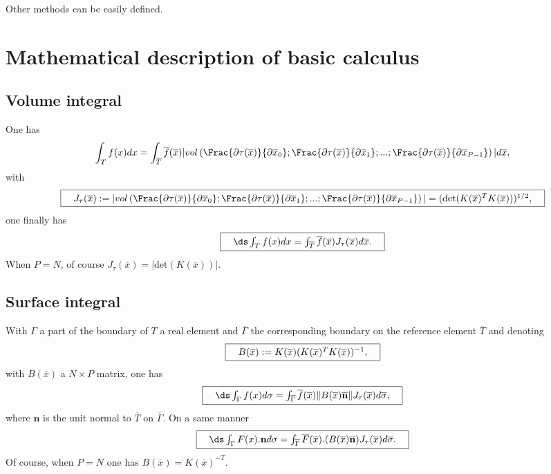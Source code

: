 \documentclass[11pt,a4paper]{article}
\begin{document}
Other methods can be easily defined.

\section{Mathematical description of basic calculus}

\subsection{Volume integral}
One has
$$ \int_T f(x) dx = \int_{\overline{T}} \overline{f}(\overline{x}) |vol\left(\Frac{\partial \tau(\overline{x})}{\partial \overline{x}_0} ;\Frac{\partial \tau(\overline{x})}{\partial \overline{x}_1}; ...; \Frac{\partial \tau(\overline{x})}{\partial \overline{x}_{P-1} }\right)| d\overline{x}, $$
with
$$ \fbox{$\hspace{1em} J_{\tau}(\overline{x}) := |vol\left(\Frac{\partial \tau(\overline{x})}{\partial \overline{x}_0} ;\Frac{\partial \tau(\overline{x})}{\partial \overline{x}_1}; ...; \Frac{\partial \tau(\overline{x})}{\partial \overline{x}_{P-1} }\right)| = (\mbox{det}(K(\overline{x})^T K(\overline{x})))^{1/2},\hspace{1em}$} $$
one finally has
$$ \fbox{$\hspace{1em} \ds \int_T f(x) dx = \int_{\overline{T}} \overline{f}(\overline{x})  J_{\tau}(\overline{x})d\overline{x}.\hspace{1em}$} $$
When $P = N$, of course $J_{\tau}(\overline{x}) = |\mbox{det}(K(\overline{x}))|$.

\subsection{Surface integral}
With $\Gamma$ a part of the boundary of $T$ a real element and $\overline{\Gamma}$ the corresponding boundary on the reference element $\overline{T}$ and denoting
$$ \fbox{$\hspace{1em} B(\overline{x}) := K(\overline{x})(K(\overline{x})^T K(\overline{x}))^{-1},\hspace{1em}$} $$
with $B(\overline{x})$ a $N \times P$ matrix, one has
$$ \fbox{$\hspace{1em} \ds \int_{\Gamma} f(x) d\sigma = \int_{\overline{\Gamma}} \overline{f}(\overline{x}) \|B(\overline{x})\overline{\mathbf n}\| J_{\tau}(\overline{x}) d\overline{\sigma},\hspace{1em}$} $$
where ${\mathbf n}$ is the unit normal to $\overline{T}$ on $\overline{\Gamma}$. On a same manner
$$ \fbox{$\hspace{1em} \ds \int_{\Gamma} F(x).{\mathbf n} d\sigma = \int_{\overline{\Gamma}} \overline{F}(\overline{x}).(B(\overline{x})\overline{\mathbf n}) J_{\tau}(\overline{x}) d\overline{\sigma}.\hspace{1em}$} $$
Of course, when $P = N$ one has $B(\overline{x}) = K(\overline{x})^{-T}$.
\end{document}
